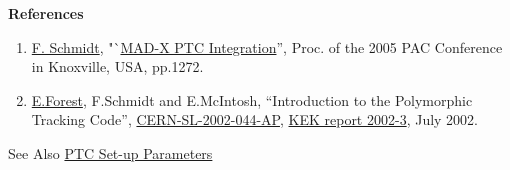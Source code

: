 {\bf References}
\begin{enumerate}
   \item \href{F._Schmidt}{F. Schmidt},
     "`\href{http://cern.ch/madx/doc/MPPE012.pdf}{MAD-X PTC
     Integration}'',  
     Proc. of the 2005 PAC Conference in Knoxville, USA, pp.1272. 
   \item \href{E._Forest}{E.Forest}, F.Schmidt and E.McIntosh,
     ``Introduction to the Polymorphic Tracking Code'',  
     \href{http://cern.ch/madx/doc/sl-2002-044.pdf}{CERN-SL-2002-044-AP}, 
     \href{http://ccdb4fs.kek.jp/cgi-bin/img/allpdf?200302020}{KEK
       report 2002-3}, July 2002. 
\end{enumerate}


See Also \href{../ptc_general/ptc_general.html}{PTC Set-up Parameters}


